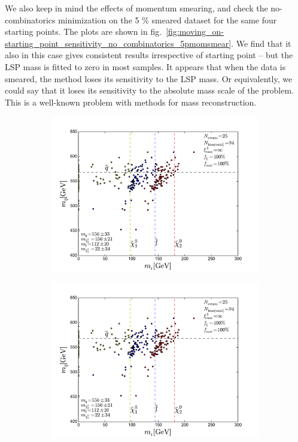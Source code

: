 \documentclass[twoside,english]{uiofysmaster}
\begin{document}
We also keep in mind the effects of momentum smearing, and check the no-combinatorics minimization on the 5 \% smeared dataset for the same four starting points. The plots are shown in fig.\ \ref{fig:moving_on-starting_point_sensitivity_no_combinatorics_5pmomsmear}. We find that it also in this case gives consistent results irrespective of starting point -- but the LSP mass is fitted to zero in most samples. It appears that when the data is smeared, the method loses its sensitivity to the LSP mass. Or equivalently, we could say that it loses its sensitivity to the absolute mass scale of the problem. This is a well-known problem with methods for mass reconstruction.

\begin{figure}[hbt]
	\centering
	\begin{subfigure}[b]{0.45\textwidth}
		\includegraphics[width=\textwidth]{figures/improving_combinatorics/herwigpp_5psmear_lowtol_nocomb_TMP.pdf} 
		\caption{ }
	\end{subfigure}
	\begin{subfigure}[b]{0.45\textwidth}
		\includegraphics[width=\textwidth]{figures/improving_combinatorics/herwigpp_5psmear_lowtol_nocomb_400-300-200-100.pdf}
		\caption{ } 
	\end{subfigure}


\end{figure}
\end{document}
